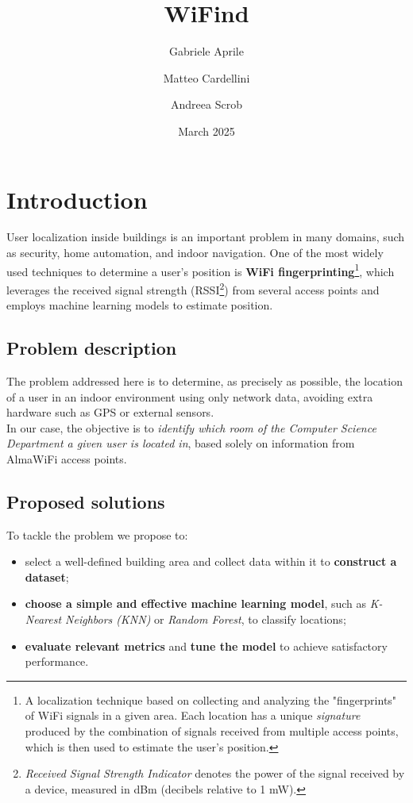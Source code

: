 \documentclass{article}
\title{{\myfont WiFind}}
\author{
    Gabriele Aprile
    \and
    Matteo Cardellini
    \and
    Andreea Scrob
}
\date{March 2025}
\begin{document}
\maketitle

\begingroup
\hypersetup{hidelinks} 
\tableofcontents
\endgroup

\newpage

\section{Introduction}
User localization inside buildings is an important problem in many domains, such as security, home automation, and indoor navigation. One of the most widely used techniques to determine a user's position is \textbf{WiFi fingerprinting}\footnote{A localization technique based on collecting and analyzing the "fingerprints" of WiFi signals in a given area. Each location has a unique \textit{signature} produced by the combination of signals received from multiple access points, which is then used to estimate the user's position.}, which leverages the received signal strength (RSSI\footnote{\textit{Received Signal Strength Indicator} denotes the power of the signal received by a device, measured in dBm (decibels relative to 1 mW).}) from several access points and employs machine learning models to estimate position.

\subsection{Problem description}
The problem addressed here is to determine, as precisely as possible, the location of a user in an indoor environment using only network data, avoiding extra hardware such as GPS or external sensors.\\
In our case, the objective is to \textit{identify which room of the Computer Science Department a given user is located in}, based solely on information from AlmaWiFi access points.

\subsection{Proposed solutions}
To tackle the problem we propose to:
\begin{itemize}
    \item select a well-defined building area and collect data within it to \textbf{construct a dataset};
    \item \textbf{choose a simple and effective machine learning model}, such as \textit{K-Nearest Neighbors (KNN)} or \textit{Random Forest}, to classify locations;
    \item \textbf{evaluate relevant metrics} and \textbf{tune the model} to achieve satisfactory performance.
\end{itemize}
\end{document}
